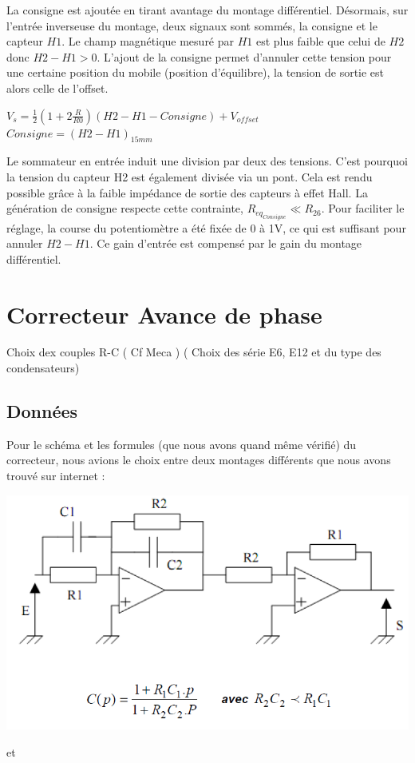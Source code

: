 \documentclass[11pt, french]{article} %
\begin{document}
La consigne est ajoutée en tirant avantage du montage différentiel. Désormais, sur l'entrée inverseuse du montage, deux signaux sont sommés, la consigne et le capteur $H1$. Le champ magnétique mesuré par $H1$ est plus faible que celui de $H2$ donc $H2-H1>0$. L'ajout de la consigne permet d'annuler cette tension pour une certaine position du mobile (position d'équilibre), la tension de sortie est alors celle de l'offset.
\begin{center}
$V_s=\frac{1}{2}(1+2 \frac{R}{R0})(H2-H1-Consigne) + V_{offset}$
$Consigne = (H2-H1)_{15mm}$
\end{center}
Le sommateur en entrée induit une division par deux des tensions. C'est pourquoi la tension du capteur H2 est également divisée via un pont. Cela est rendu possible grâce à la faible impédance de sortie des capteurs à effet Hall. La génération de consigne respecte cette contrainte, $R_{eq_{Consigne}} \ll R_{26}$. Pour faciliter le réglage, la course du potentiomètre a été fixée de 0 à 1V, ce qui est suffisant pour annuler $H2-H1$. Ce gain d'entrée est compensé par le gain du montage différentiel. 




\section{Correcteur Avance de phase}

Choix dex couples R-C ( Cf Meca ) ( Choix des série E6, E12 et du type des condensateurs)



\subsection{Données}

\noindent
Pour le schéma et les formules (que nous avons quand même vérifié) du correcteur, nous avions le choix entre deux montages différents que nous avons trouvé sur internet :

\begin{center}
\includegraphics[width = 15cm]{SolutionAnalogique/Avph.png} 
\end{center}
et
\begin{center}
\end{center}
\end{document}
